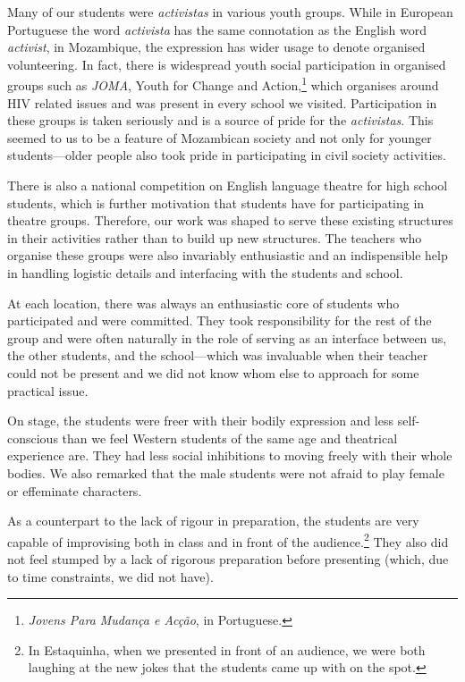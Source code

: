 \documentclass[article,twocolumn,twoside]{memoir}
\begin{document}
Many of our students were \textit{activistas} in various youth groups. While in
European Portuguese the word \textit{activista} has the same connotation as the
English word \textit{activist}, in Mozambique, the expression has wider usage
to denote organised volunteering. In fact, there is widespread youth social
participation in organised groups such as \textit{JOMA}, Youth for Change and
Action,\footnote{\textit{Jovens Para Mudança e Acção}, in Portuguese.} which
organises around HIV related issues and was present in every school we visited.
Participation in these groups is taken seriously and is a source of pride for
the \textit{activistas}. This seemed to us to be a feature of Mozambican
society and not only for younger students---older people also took pride in
participating in civil society activities.

There is also a national competition on English language theatre for high
school students, which is further motivation that students have for
participating in theatre groups. Therefore, our work was shaped to serve these
existing structures in their activities rather than to build up new structures.
The teachers who organise these groups were also invariably enthusiastic and an
indispensible help in handling logistic details and interfacing with the
students and school.

At each location, there was always an enthusiastic core of students who
participated and were committed. They took responsibility for the rest of the
group and were often naturally in the role of serving as an interface between
us, the other students, and the school---which was invaluable when their
teacher could not be present and we did not know whom else to approach for some
practical issue.

On stage, the students were freer with their bodily expression and less
self-conscious than we feel Western students of the same age and theatrical
experience are. They had less social inhibitions to moving freely with their
whole bodies. We also remarked that the male students were not afraid to play
female or effeminate characters.

As a counterpart to the lack of rigour in preparation, the students are
very capable of improvising both in class and in front of the
audience.\footnote{In Estaquinha, when we presented in front of an audience, we
were both laughing at the new jokes that the students came up with on the
spot.} They also did not feel stumped by a lack of rigorous preparation before
presenting (which, due to time constraints, we did not have).
\end{document}
